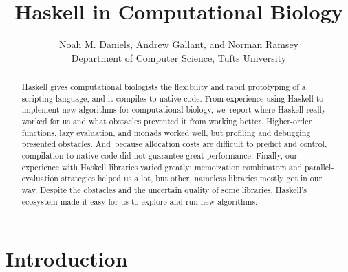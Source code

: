 \documentclass[]{jfp1}
\title{Haskell in Computational Biology}
\author[N. M. Daniels, A. Gallant, and N. Ramsey]
        {Noah M. Daniels, Andrew Gallant, and Norman Ramsey \\
           {Department of Computer Science, Tufts University}\\
           {\email{{\rmfamily\{}ndaniels, agallant, nr{\rmfamily\}}@cs.tufts.edu}}}
\begin{document}
\overfullrule=10pt


\iftimestamp
\fi


\maketitle

%
%
%
\begin{abstract}
Haskell gives computational biologists
the flexibility and rapid prototyping of a scripting
language, and it compiles to native code.
From experience using Haskell to implement new algorithms for
computational biology, we~report where Haskell really worked for us
and what obstacles prevented it from working better.
Higher-order functions, lazy evaluation, and
monads worked well, but
profiling and debugging presented obstacles.
And~because allocation costs are difficult to predict and control,
compilation to native code did not guarantee great performance.
Finally, our experience with Haskell libraries varied greatly:
memoization combinators and parallel-evaluation
strategies helped us a lot,
but other, nameless libraries mostly got in our way.
Despite the obstacles and the uncertain quality of some libraries,
Haskell's ecosystem
made it easy for us to explore and run new algorithms.
\end{abstract}


\section{Introduction}
\end{document}
